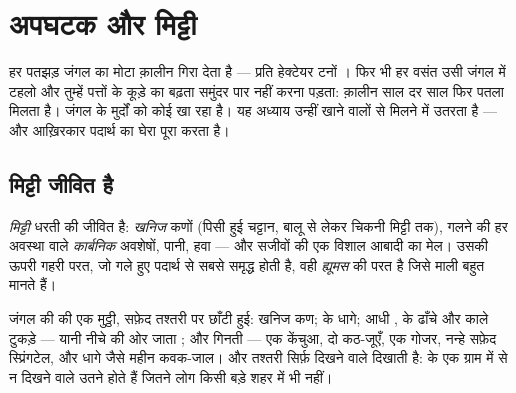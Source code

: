 \chapter{अपघटक और मिट्टी}\label{ch:g6:decomposers-and-soil}

हर पतझड़ जंगल  का मोटा क़ालीन गिरा देता है --- प्रति हेक्टेयर
टनों । फिर भी हर वसंत उसी जंगल में टहलो और तुम्हें पत्तों के
कूड़े का बढ़ता समुंदर पार नहीं करना पड़ता: क़ालीन साल दर साल फिर पतला
मिलता है। जंगल के मुर्दों को कोई खा रहा है। यह अध्याय उन्हीं खाने वालों
से मिलने  में उतरता है --- और आख़िरकार पदार्थ का घेरा पूरा करता
है।

\section{मिट्टी जीवित है}

\begin{definition}[मिट्टी]\label{def:g6:decomposers-and-soil:soil}
\emph{मिट्टी} धरती की जीवित  है: \emph{खनिज} कणों
(पिसी हुई चट्टान, बालू से लेकर चिकनी मिट्टी तक), गलने की हर अवस्था वाले
\emph{कार्बनिक} अवशेषों, पानी, हवा --- और सजीवों की एक विशाल आबादी का
मेल। उसकी ऊपरी गहरी परत, जो गले हुए पदार्थ से सबसे समृद्ध होती है, वही
\emph{ह्यूमस} की परत है जिसे माली बहुत मानते हैं।
\end{definition}

\begin{example}[एक मुट्ठी, गिनी हुई]\label{ex:g6:decomposers-and-soil:handful}
जंगल की  की एक मुट्ठी, सफ़ेद तश्तरी पर छाँटी हुई: खनिज कण; 
के धागे; आधी ,  के ढाँचे और काले टुकड़े --- यानी नीचे
की ओर जाता ; और गिनती --- एक केंचुआ, दो कठ-जूएँ, एक
गोजर, नन्हे सफ़ेद स्प्रिंगटेल, और धागे जैसे महीन कवक-जाल। और तश्तरी
सिर्फ़ दिखने वाले दिखाती है:  के एक ग्राम में  से न दिखने
वाले उतने  होते हैं जितने लोग किसी बड़े शहर में भी नहीं।
\end{example}

